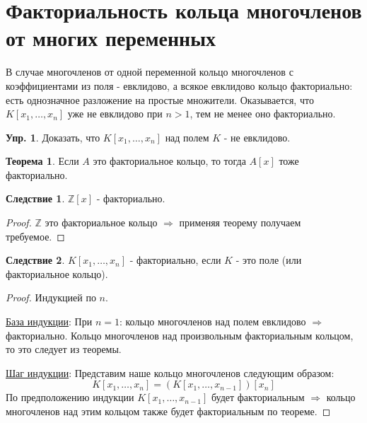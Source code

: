 \documentclass[12pt]{article}
\newcommand{\MZ}{\mathbb{Z}}
\theoremstyle{definition}
\newtheorem{exrc}{Упр.}
\newtheorem{theorem}{Теорема}
\newtheorem{corollary}{Следствие}
\begin{document}
\section*{Факториальность кольца многочленов от многих переменных}
В случае многочленов от одной переменной кольцо многочленов с коэффициентами из поля - евклидово, а всякое евклидово кольцо факториально: есть однозначное разложение на простые множители. Оказывается, что $K[x_1,\dotsc,x_n]$ уже не евклидово при $n > 1$, тем не менее оно факториально.

\begin{exrc}
	Доказать, что $K[x_1,\dotsc,x_n]$ над полем $K$ - не евклидово.
\end{exrc}

\begin{theorem}
	Если $A$ это факториальное кольцо, то тогда $A[x]$ тоже факториально.
\end{theorem}
\begin{corollary}
	$\MZ[x]$ - факториально.
\end{corollary}
\begin{proof}
	$\MZ$ это факториальное кольцо $\Rightarrow$ применяя теорему получаем требуемое.
\end{proof}
\begin{corollary}
	$K[x_1,\dotsc,x_n]$ - факториально, если $K$ - это поле (или факториальное кольцо).
\end{corollary}
\begin{proof}
	Индукцией по $n$.
	
	\uline{База индукции}: При $n = 1$: кольцо многочленов над полем евклидово $\Rightarrow$ факториально. Кольцо многочленов над произвольным факториальным кольцом, то это следует из теоремы.
	
	\uline{Шаг индукции}: Представим наше кольцо многочленов следующим образом: 
	$$
		K[x_1,\dotsc,x_n] = \left(K[x_1,\dotsc,x_{n-1}]\right)[x_n]
	$$ 
	По предположению индукции $K[x_1,\dotsc,x_{n-1}]$ будет факториальным $\Rightarrow$ кольцо многочленов над этим кольцом также будет факториальным по теореме.
\end{proof}
\end{document}
